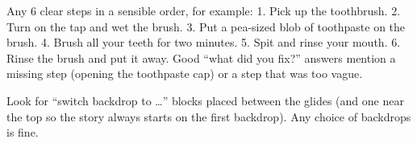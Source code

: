 \begin{answer}
Any 6 clear steps in a sensible order, for example: 1. Pick up the toothbrush. 2. Turn on the tap and wet the brush. 3. Put a pea-sized blob of toothpaste on the brush. 4. Brush all your teeth for two minutes. 5. Spit and rinse your mouth. 6. Rinse the brush and put it away. Good \enquote{what did you fix?} answers mention a missing step (opening the toothpaste cap) or a step that was too vague.
\end{answer}

\begin{answer}
Look for \enquote{switch backdrop to \ldots} blocks placed between the glides (and one near the top so the story always starts on the first backdrop). Any choice of backdrops is fine.
\end{answer}
